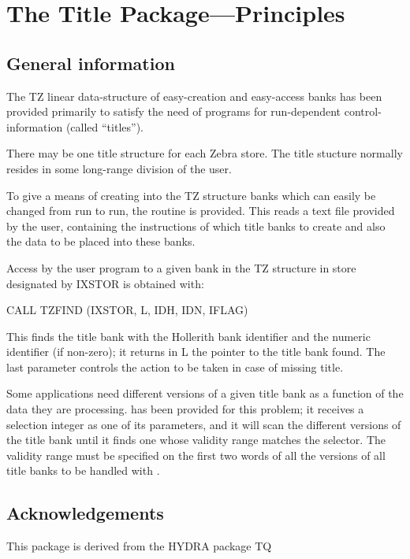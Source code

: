 \chapter{The Title Package---Principles}

\section{General information}

The TZ linear data-structure of easy-creation and easy-access
banks has been provided primarily to satisfy the need of
programs for run-dependent control-information
(called ``titles'').

There may be one title structure for each Zebra store.
The title stucture normally resides in some
long-range division of the user.

To give a means of creating into the TZ structure banks which
can easily be changed from run to run,
the routine  is provided.
This reads a text file provided by the user,
containing the instructions of which title banks to create
and also the data to be placed into these banks.

Access by the user program to a given bank in the TZ structure
in store designated by IXSTOR is obtained with:
\begin{XMP}
      CALL TZFIND (IXSTOR, L, IDH, IDN, IFLAG)
\end{XMP}
This finds the title bank with the Hollerith bank identifier 
and the numeric identifier  (if non-zero);
it returns in L the pointer to the title bank found.
The last parameter controls the action to be taken
in case of missing title.

Some applications need different versions of a given title bank
as a function of the data they are processing.
 has been provided for this problem; it receives a selection
integer as one of its parameters, and it will scan the different
versions of the title bank until it finds one whose validity range
matches the selector.
The validity range must be specified on the first two words of
all the versions of all title banks to be handled with .

\section*{Acknowledgements}

This package is derived from the HYDRA package TQ

